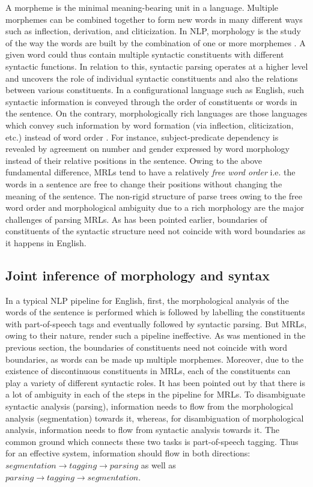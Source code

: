A morpheme is the minimal meaning-bearing unit in a language. Multiple morphemes can be combined together to form new words in many different ways such as inflection, derivation, and cliticization. In NLP, morphology is the study of the way the words are built by the combination of one or more morphemes \cite{Jurafsky:2009:SLP:1214993}. A given word could thus contain multiple syntactic constituents with different syntactic functions. In relation to this, syntactic parsing operates at a higher level and uncovers the role of individual syntactic constituents and also the relations between various constituents. In a configurational language such as English, such syntactic information is conveyed through the order of constituents or words in the sentence. On the contrary, morphologically rich languages are those languages which convey such information by word formation (via inflection, cliticization, etc.) instead of word order \cite{seddah2013overview}. For instance, subject-predicate dependency is revealed by agreement on number and gender expressed by word morphology instead of their relative positions in the sentence. Owing to the above fundamental difference, MRLs tend to have a relatively \textit{free word order} i.e. the words in a sentence are free to change their positions without changing the meaning of the sentence. The non-rigid structure of parse trees owing to the free word order and morphological ambiguity due to a rich morphology are the major challenges of parsing MRLs. As has been pointed earlier, boundaries of constituents of the syntactic structure need not coincide with word boundaries as it happens in English.

\subsection{Joint inference of morphology and syntax}
\label{sec:joint}
In a typical NLP pipeline for English, first, the morphological analysis of the words of the sentence is performed which is followed by labelling the constituents with part-of-speech tags and eventually followed by syntactic parsing. But MRLs, owing to their nature, render such a pipeline ineffective. As was mentioned in the previous section, the boundaries of constituents need not coincide with word boundaries, as words can be made up multiple morphemes. Moreover, due to the existence of discontinuous constituents in MRLs, each of the constituents can play a variety of different syntactic roles. It has been pointed out by \cite{tsarfaty:2006} that there is a lot of ambiguity in each of the steps in the pipeline for MRLs. To disambiguate syntactic analysis (parsing), information needs to flow from the morphological analysis (segmentation) towards it, whereas, for disambiguation of morphological analysis, information needs to flow from syntactic analysis towards it. The common ground which connects these two tasks is part-of-speech tagging. Thus for an effective system, information should flow in both directions: $segmentation \rightarrow tagging \rightarrow parsing$ as well as $parsing \rightarrow tagging \rightarrow segmentation$.


